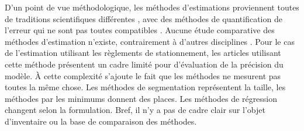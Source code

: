     D'un point de vue méthodologique, les méthodes d'estimations proviennent toutes de traditions scientifiques différentes , avec des méthodes de quantification de l'erreur qui ne sont pas toutes compatibles \parencite{ziman_research_1984,breiman_statistical_2001}. Aucune étude comparative des méthodes d'estimation n’existe, contrairement à d'autres disciplines \parencite{rhodes_relative_2015}. Pour le cas de l'estimation utilisant les règlements de stationnement, les articles utilisant cette méthode présentent un cadre limité pour d'évaluation de la précision du modèle. À cette complexité s'ajoute le fait que les méthodes ne mesurent pas toutes la même chose. Les méthodes de segmentation représentent la taille, les méthodes par les minimums donnent des places. Les méthodes de régression changent selon la formulation. Bref, il n'y a pas de cadre clair sur l'objet d'inventaire ou la base de comparaison des méthodes.
    \newcommand{\TitreTableSyntheseInv}{Synthèse des méthodes d'estimation de la capacité de stationnement}
